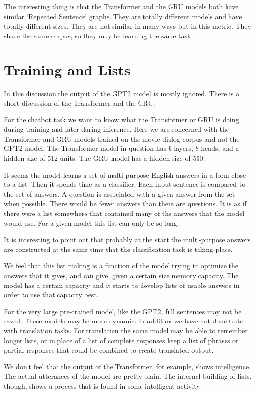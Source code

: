The interesting thing is that the Transformer and the GRU models both have similar `Repeated Sentence' graphs. They are totally different models and have totally different sizes. They are not similar in many ways but in this metric. They share the same corpus, so they may be learning the same task.

\section{Training and Lists}
In this discussion the output of the GPT2 model is mostly ignored. There is a short discussion of the Transformer and the GRU.

For the chatbot task we want to know what the Transformer or GRU is doing during training and later during inference. Here we are concerned with the Transformer and GRU models trained on the movie dialog corpus and not the GPT2 model. The Transformer model in question has 6 layers, 8 heads, and a hidden size of 512 units. The GRU model has a hidden size of 500.

It seems the model learns a set of multi-purpose English answers in a form close to a list. Then it spends time as a classifier. Each input sentence is compared to the set of answers. A question is associated with a given answer from the set when possible. There would be fewer answers than there are questions. It is as if there were a list somewhere that contained many of the answers that the model would use. For a given model this list can only be so long.

It is interesting to point out that probably at the start the multi-purpose answers are constructed at the same time that the classification task is taking place. 

We feel that this list making is a function of the model trying to optimize the answers that it gives, and can give, given a certain size memory capacity. The model has a certain capacity and it starts to develop lists of usable answers in order to use that capacity best.

For the very large pre-trained model, like the GPT2, full sentences may not be saved. These models may be more dynamic. In addition we have not done tests with translation tasks. For translation the same model may be able to remember longer lists, or in place of a list of complete responses keep a list of phrases or partial responses that could be combined to create translated output.

We don't feel that the output of the Transformer, for example, shows intelligence. The actual utterances of the model are pretty plain. The internal building of lists, though, shows a process that is found in some intelligent activity.